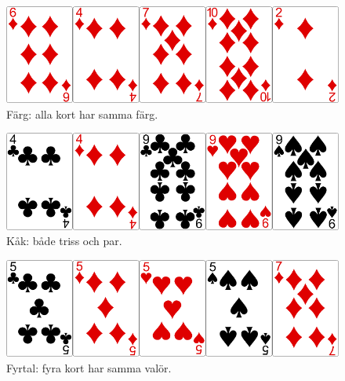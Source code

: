 \begin{figure}[H]
 \begin{minipage}[c]{\CardWidth}
  \includegraphics[width=\textwidth]{../img/w05-hands/flush.png}
 \end{minipage}
 \begin{minipage}[c]{\CardCaptionWidth}
  \caption{Färg: alla kort har samma färg.}
 \end{minipage}
\end{figure}

\begin{figure}[H]
 \begin{minipage}[c]{\CardWidth}
  \includegraphics[width=\textwidth]{../img/w05-hands/fullhouse.png}
 \end{minipage}
 \begin{minipage}[c]{\CardCaptionWidth}
  \caption{Kåk: både triss och par.}
 \end{minipage}
\end{figure}

\begin{figure}[H]
 \begin{minipage}[c]{\CardWidth}
  \includegraphics[width=\textwidth]{../img/w05-hands/fours.png}
 \end{minipage}
 \begin{minipage}[c]{\CardCaptionWidth}
  \caption{Fyrtal: fyra kort har samma valör.}
 \end{minipage}
\end{figure}

